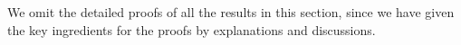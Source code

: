 \documentclass[12pt,a4paper]{article}
\begin{document}
We omit the detailed proofs of all the results in this section, since we have given the key ingredients‌ for the proofs by explanations and discussions.%


 












\end{document}
